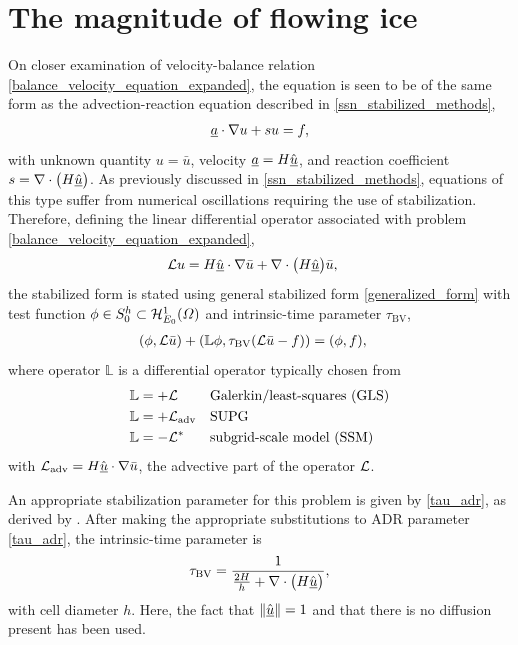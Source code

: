 \section{The magnitude of flowing ice}

On closer examination of velocity-balance relation \cref{balance_velocity_equation_expanded}, the equation is seen to be of the same form as the advection-reaction equation described in \cref{ssn_stabilized_methods},
\begin{align*}
  \underline{a} \cdot \nabla u + s u = f,
\end{align*}
with unknown quantity $u = \bar{u}$, velocity $\underline{a} = H \hat{\underline{u}}$, and reaction coefficient $s = \nabla \cdot \big( H \underline{\hat{u}} \big)$.  As previously discussed in \cref{ssn_stabilized_methods}, equations of this type suffer from numerical oscillations requiring the use of stabilization.  Therefore, defining the linear differential operator associated with problem \cref{balance_velocity_equation_expanded},
\begin{align}
  \label{bv_linear_operator}
  \mathcal{L} u &= H \hat{\underline{u}} \cdot \nabla \bar{u} + \nabla \cdot \big( H \underline{\hat{u}} \big) \bar{u},
\end{align}
the stabilized form is stated using general stabilized form \cref{generalized_form} with test function $\phi \in S_0^h \subset \mathcal{H}_{E_0}^1(\varOmega)$ and intrinsic-time parameter  $\tau_{\text{BV}}$,
\begin{align}
  \label{bv_generalized_form}
  (\phi, \mathcal{L} \bar{u}) + (\mathbb{L} \phi, \tau_{\text{BV}}(\mathcal{L}\bar{u} - f)) &= (\phi, f),
\end{align}
where operator $\mathbb{L}$ is a differential operator typically chosen from
\begin{align}
  \label{bv_gls_operator}
  \mathbb{L} &= + \mathcal{L} && \text{Galerkin/least-squares (GLS)} \\
  \label{bv_supg_operator}
  \mathbb{L} &= + \mathcal{L}_{\text{adv}} && \text{SUPG} \\
  \label{bv_ssm_operator}
  \mathbb{L} &= - \mathcal{L}^* && \text{subgrid-scale model (SSM)}
\end{align}
with $\mathcal{L}_{\text{adv}} = H\hat{\underline{u}} \cdot \nabla \bar{u}$, the advective part of the operator $\mathcal{L}$.

An appropriate stabilization parameter for this problem is given by \cref{tau_adr}, as derived by \citet{codina_1992}.  After making the appropriate substitutions to ADR parameter \cref{tau_adr}, the intrinsic-time parameter is
\begin{align}
  \label{tau_bv}
  \tau_{\text{BV}} = \frac{1}{\frac{2 H}{h} + \nabla \cdot \big( H \hat{\underline{u}} \big)},
\end{align}
with cell diameter $h$.  Here, the fact that $\Vert \hat{\underline{u}} \Vert = 1$ and that there is no diffusion present has been used.

